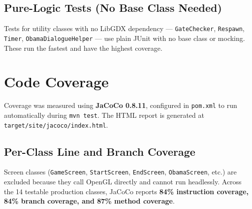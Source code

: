 \documentclass[12pt]{article}
\begin{document}
\subsection{Pure-Logic Tests (No Base Class Needed)}

Tests for utility classes with no LibGDX dependency — \texttt{GateChecker}, \texttt{Respawn}, \texttt{Timer}, \texttt{ObamaDialogueHelper} — use plain JUnit with no base class or mocking. These run the fastest and have the highest coverage.

\section{Code Coverage}

Coverage was measured using \textbf{JaCoCo 0.8.11}, configured in \texttt{pom.xml} to run automatically during \texttt{mvn test}. The HTML report is generated at \texttt{target/site/jacoco/index.html}.

\subsection{Per-Class Line and Branch Coverage}

Screen classes (\texttt{GameScreen}, \texttt{StartScreen}, \texttt{EndScreen}, \texttt{ObamaScreen}, etc.) are excluded because they call OpenGL directly and cannot run headlessly. Across the 14 testable production classes, JaCoCo reports \textbf{84\% instruction coverage, 84\% branch coverage, and 87\% method coverage}.
\end{document}
